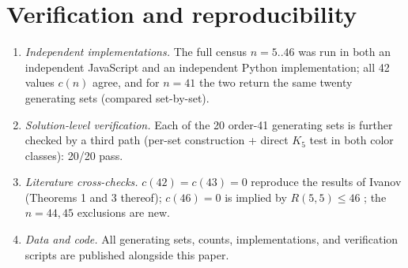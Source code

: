\documentclass[11pt]{article}
\theoremstyle{remark}
\begin{document}
\section{Verification and reproducibility}\label{sec:verify}
\begin{enumerate}
\item \emph{Independent implementations.} The full census $n = 5..46$ was run in both an
independent JavaScript and an independent Python implementation; all 42 values $c(n)$
agree, and for $n=41$ the two return the same twenty generating sets (compared
set-by-set).
\item \emph{Solution-level verification.} Each of the 20 order-41 generating sets is further
checked by a third path (per-set construction + direct $K_5$ test in both color classes):
20/20 pass.
\item \emph{Literature cross-checks.} $c(42)=c(43)=0$ reproduce the results of
Ivanov \cite{ivanov2026} (Theorems 1 and 3 thereof); $c(46)=0$ is implied by
$R(5,5)\le46$ \cite{am2024}; the $n=44,45$ exclusions are new.
\item \emph{Data and code.} All generating sets, counts, implementations, and verification
scripts are published alongside this paper.
\end{enumerate}
\end{document}

